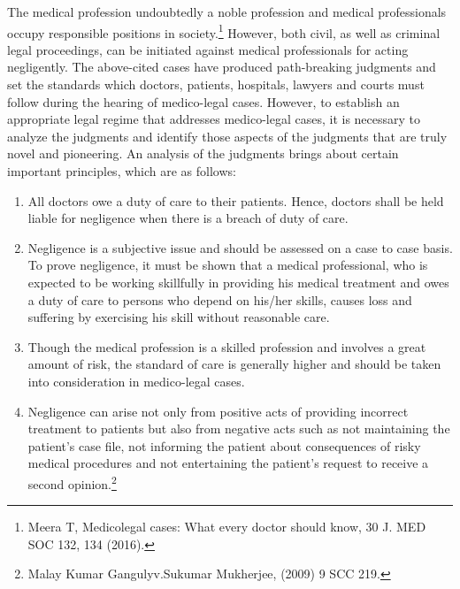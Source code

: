 \begin{multicols}{2}

\noi
The medical profession undoubtedly a noble profession and medical professionals occupy
responsible positions in society.\footnote{Meera T, Medicolegal cases: What every doctor should know, 30 J. MED SOC 132, 134 (2016).} However, both civil, as well as criminal legal proceedings, can
be initiated against medical professionals for acting negligently. The above-cited cases have
produced path-breaking judgments and set the standards which doctors, patients, hospitals, 
lawyers and courts must follow during the hearing of medico-legal cases. However, to establish
an appropriate legal regime that addresses medico-legal cases, it is necessary to analyze the
judgments and identify those aspects of the judgments that are truly novel and pioneering. An
analysis of the judgments brings about certain important principles, which are as follows:

\vspace{-.1cm}

\begin{enumerate}
\itemsep=0pt

\item All doctors owe a duty of care to their patients. Hence, doctors shall be held liable for
negligence when there is a breach of duty of care.

\item Negligence is a subjective issue and should be assessed on a case to case basis. To prove
negligence, it must be shown that a medical professional, who is expected to be working skillfully
in providing his medical treatment and owes a duty of care to persons who depend on his/her
skills, causes loss and suffering by exercising his skill without reasonable care.

\item Though the medical profession is a skilled profession and involves a great amount of risk, the
standard of care is generally higher and should be taken into consideration in medico-legal cases.

\item Negligence can arise not only from positive acts of providing incorrect treatment to patients
but also from negative acts such as not maintaining the patient’s case file, not informing the
patient about consequences of risky medical procedures and not entertaining the patient’s request
to receive a second opinion.\footnote{Malay Kumar Gangulyv.Sukumar Mukherjee, (2009) 9 SCC 219.}


\end{enumerate}
\end{multicols}
